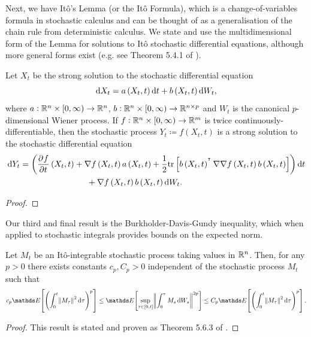 Next, we have It\^o's Lemma (or the It\^o Formula), which is a change-of-variables formula in stochastic calculus and can be thought of as a generalisation of the chain rule from deterministic calculus.
We state and use the multidimensional form of the Lemma for solutions to It\^o stochastic differential equations, although more general forms exist (e.g. see Theorem 5.4.1 of \citet{KallianpurSundar_2014_StochasticAnalysisDiffusion}).
\begin{theorem}[It\^o's Lemma]
	Let \(X_t\) be the strong solution to the stochastic differential equation
	\[
		\dif X_t = a\left(X_t, t\right)\dif t + b\left(X_t, t\right)\dif W_t,
	\]
	where \(a: \mathbb{R}^n \times [0,\infty) \to \mathbb{R}^n\), \(b: \mathbb{R}^n \times [0,\infty) \to \mathbb{R}^{n\times p}\) and \(W_t\) is the canonical \(p\)-dimensional Wiener process.
	If \(f: \mathbb{R}^n \times [0, \infty) \to \mathbb{R}^m\) is twice continuously-differentiable, then the stochastic process \(Y_t \coloneqq f\left(X_t, t\right)\) is a strong solution to the stochastic differential equation
	\begin{align*}
		\dif Y_t & = \left(\dpd{f}{t}\left(X_t, t\right) + \nabla f\left(X_t, t\right) a\left(X_t, t\right) + \frac12\mathrm{tr}\left[b\left(X_t, t\right)^{\T} \nabla\nabla f\left(X_t, t\right) b\left(X_t, t\right)\right] \right)\dif t \\
		         & \qquad\qquad\qquad\qquad + \nabla f\left(X_t, t\right)b\left(X_t, t\right) \dif W_t.
	\end{align*}
\end{theorem}
\begin{proof}

\end{proof}

Our third and final result is the Burkholder-Davis-Gundy inequality, which when applied to stochastic integrals provides bounds on the expected norm.
\begin{theorem}
	Let \(M_t\) be an It\^o-integrable stochastic process taking values in \(\mathbb{R}^n\).
	Then, for any \(p > 0\) there exists constants \(c_p, C_p > 0\) independent of the stochastic process \(M_t\) such that
	\[
		c_p\avg{\left(\int_0^t{\norm{M_\tau}^2\dif \tau}\right)^p} \leq \avg{\sup_{\tau \in \left[0, t\right]}\norm{\int_0^\tau{M_s\dif W_s}}^{2p}} \leq C_p\avg{\left(\int_0^t{\norm{M_\tau}^2\dif \tau}\right)^p}.
	\]
\end{theorem}
\begin{proof}
	This result is stated and proven as Theorem 5.6.3 of \citet{KallianpurSundar_2014_StochasticAnalysisDiffusion}.
\end{proof}



